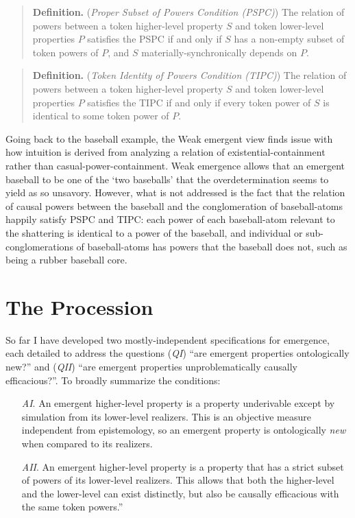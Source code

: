\documentclass{article}
\newcommand{\ti}[1]{\textit{#1}}
\newcommand{\tb}[1]{\textbf{#1}}
\begin{document}
\begin{quote}
\tb{Definition.} (\ti{Proper Subset of Powers Condition (PSPC)}) The relation of powers between a token higher-level property $S$ and token lower-level properties $P$ satisfies the PSPC if and only if $S$ has a non-empty subset of token powers of $P$, and $S$ materially-synchronically depends on $P$.
\end{quote}

\begin{quote}
\tb{Definition.} (\ti{Token Identity of Powers Condition (TIPC)}) The relation of powers between a token higher-level property $S$ and token lower-level properties $P$ satisfies the TIPC if and only if every token power of $S$ is identical to some token power of $P$.
\end{quote}

Going back to the baseball example, the Weak emergent view finds issue with how intuition is derived from analyzing a relation of existential-containment rather than casual-power-containment. Weak emergence allows that an emergent baseball to be one of the `two baseballs' that the overdetermination seems to yield as so unsavory. However, what is not addressed is the fact that the relation of causal powers between the baseball and the conglomeration of baseball-atoms happily satisfy PSPC and TIPC: each power of each baseball-atom relevant to the shattering is identical to a power of the baseball, and individual or sub-conglomerations of baseball-atoms has powers that the baseball does not, such as being a rubber baseball core.

\section{The Procession}

So far I have developed two mostly-independent specifications for emergence, each detailed to address the questions (\ti{QI}) ``are emergent properties ontologically new?'' and (\ti{QII}) ``are emergent properties unproblematically causally efficacious?''. To broadly summarize the conditions:

\begin{itemize}
\item[\ti{AI}.] An emergent higher-level property is a property underivable except by simulation from its lower-level realizers. This is an objective measure independent from epistemology, so an emergent property is ontologically \ti{new} when compared to its realizers.
\item[\ti{AII}.] An emergent higher-level property is a property that has a strict subset of powers of its lower-level realizers. This allows that both the higher-level and the lower-level can exist distinctly, but also be causally efficacious with the same token powers.''
\end{itemize}
\end{document}
